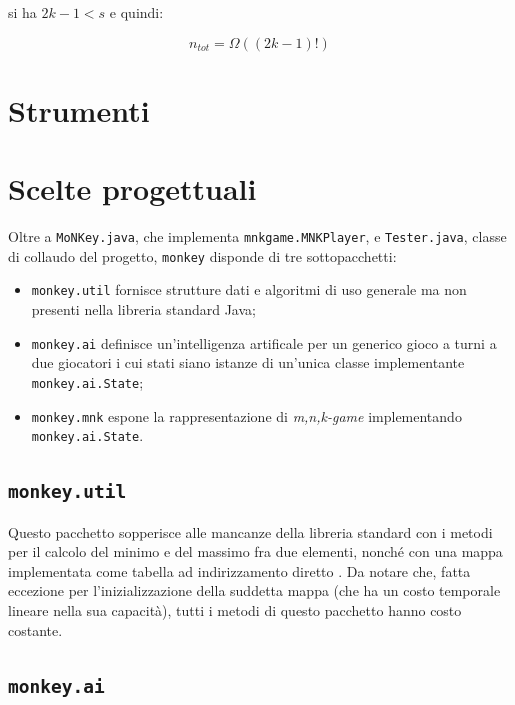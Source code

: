 \documentclass{article}
\begin{document}
si ha $2k - 1 < s$ e quindi:

\begin{equation}
  n_{tot} = \Omega ((2k - 1)!)
\end{equation}



\section{Strumenti}

\section{Scelte progettuali}

Oltre a \verb!MoNKey.java!, che implementa \verb!mnkgame.MNKPlayer!, e
\verb!Tester.java!, classe di collaudo del progetto, \verb!monkey! disponde di
tre sottopacchetti:
\begin{itemize}
  \item \verb!monkey.util! fornisce strutture dati e algoritmi di uso generale
    ma non presenti nella libreria standard Java;
  \item \verb!monkey.ai! definisce un'intelligenza artificale per un generico
    gioco a turni a due giocatori i cui stati siano istanze di un'unica classe
    implementante \verb!monkey.ai.State!;
  \item \verb!monkey.mnk! espone la rappresentazione di \emph{m,n,k-game}
    implementando \verb!monkey.ai.State!.
\end{itemize}

\subsection{\texttt{monkey.util}}

\begin{sloppypar}
Questo pacchetto sopperisce alle mancanze della libreria standard con i metodi
per il calcolo del minimo e del massimo fra due elementi, nonché con una mappa
implementata come tabella ad indirizzamento diretto
\cite{at.UBO708344820100101}. Da notare che, fatta eccezione per
l'inizializzazione della suddetta mappa (che ha un costo temporale lineare nella
sua capacità), tutti i metodi di questo pacchetto hanno costo costante.
\end{sloppypar}

\subsection{\texttt{monkey.ai}}
\end{document}
